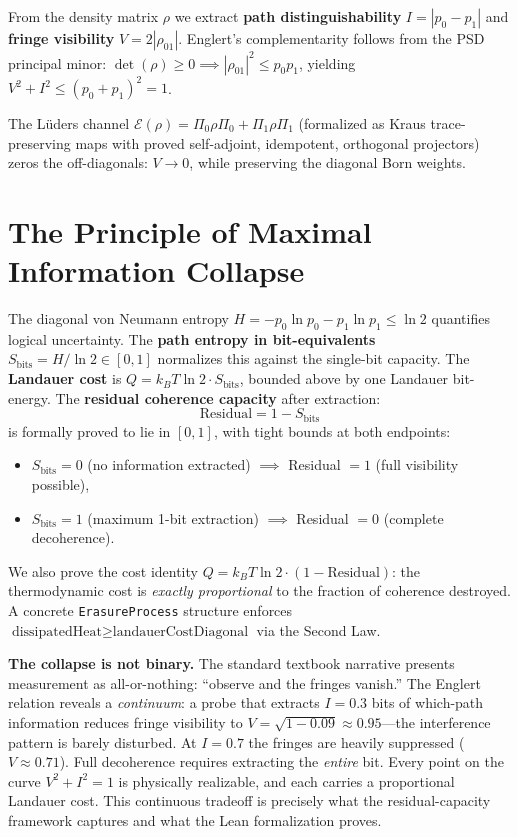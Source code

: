 \documentclass[10pt, a4paper]{article}
\begin{document}
\noindent From the density matrix $\rho$ we extract \textbf{path distinguishability} $I = |p_0 - p_1|$ and \textbf{fringe visibility} $V = 2|\rho_{01}|$. Englert's complementarity follows from the PSD principal minor: $\det(\rho) \ge 0 \implies |\rho_{01}|^2 \le p_0 p_1$, yielding $V^2 + I^2 \le (p_0 + p_1)^2 = 1$.

The L\"uders channel $\mathcal{E}(\rho) = \Pi_0 \rho \Pi_0 + \Pi_1 \rho \Pi_1$ (formalized as Kraus trace-preserving maps with proved self-adjoint, idempotent, orthogonal projectors) zeros the off-diagonals: $V \to 0$, while preserving the diagonal Born weights.

\section{The Principle of Maximal Information Collapse}

The diagonal von Neumann entropy $H = -p_0 \ln p_0 - p_1 \ln p_1 \le \ln 2$ quantifies logical uncertainty. The \textbf{path entropy in bit-equivalents} $S_{\text{bits}} = H / \ln 2 \in [0, 1]$ normalizes this against the single-bit capacity. The \textbf{Landauer cost} is $Q = k_B T \ln 2 \cdot S_{\text{bits}}$, bounded above by one Landauer bit-energy. The \textbf{residual coherence capacity} after extraction:
\[
\text{Residual} = 1 - S_{\text{bits}}
\]
is formally proved to lie in $[0, 1]$, with tight bounds at both endpoints:
\begin{itemize}
\item $S_{\text{bits}} = 0$ (no information extracted) $\implies$ Residual $= 1$ (full visibility possible),
\item $S_{\text{bits}} = 1$ (maximum 1-bit extraction) $\implies$ Residual $= 0$ (complete decoherence).
\end{itemize}
We also prove the cost identity $Q = k_B T \ln 2 \cdot (1 - \text{Residual})$: the thermodynamic cost is \emph{exactly proportional} to the fraction of coherence destroyed. A concrete \texttt{ErasureProcess} structure enforces $\text{dissipatedHeat} \ge \text{landauerCostDiagonal}$ via the Second Law.

\textbf{The collapse is not binary.} The standard textbook narrative presents measurement as all-or-nothing: ``observe and the fringes vanish.'' The Englert relation reveals a \emph{continuum}: a probe that extracts $I = 0.3$ bits of which-path information reduces fringe visibility to $V = \sqrt{1 - 0.09} \approx 0.95$---the interference pattern is barely disturbed. At $I = 0.7$ the fringes are heavily suppressed ($V \approx 0.71$). Full decoherence requires extracting the \emph{entire} bit. Every point on the curve $V^2 + I^2 = 1$ is physically realizable, and each carries a proportional Landauer cost. This continuous tradeoff is precisely what the residual-capacity framework captures and what the Lean formalization proves.
\end{document}
